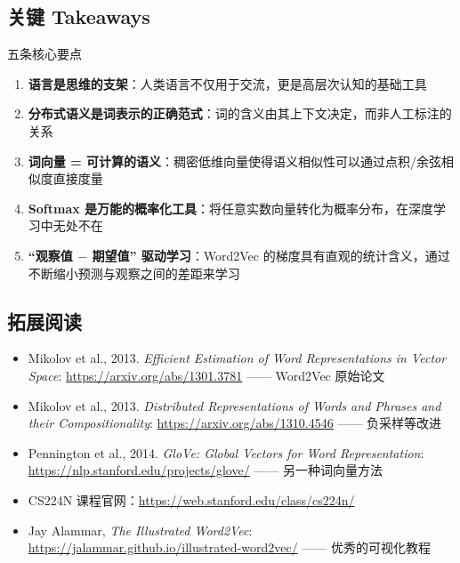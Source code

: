 \subsection{关键 Takeaways}

\begin{importantbox}{五条核心要点}
\begin{enumerate}
    \item \textbf{语言是思维的支架}：人类语言不仅用于交流，更是高层次认知的基础工具
    \item \textbf{分布式语义是词表示的正确范式}：词的含义由其上下文决定，而非人工标注的关系
    \item \textbf{词向量 = 可计算的语义}：稠密低维向量使得语义相似性可以通过点积/余弦相似度直接度量
    \item \textbf{Softmax 是万能的概率化工具}：将任意实数向量转化为概率分布，在深度学习中无处不在
    \item \textbf{``观察值 $-$ 期望值'' 驱动学习}：Word2Vec 的梯度具有直观的统计含义，通过不断缩小预测与观察之间的差距来学习
\end{enumerate}
\end{importantbox}

\subsection{拓展阅读}

\begin{itemize}
    \item Mikolov et al., 2013. \textit{Efficient Estimation of Word Representations in Vector Space}: \url{https://arxiv.org/abs/1301.3781} —— Word2Vec 原始论文
    \item Mikolov et al., 2013. \textit{Distributed Representations of Words and Phrases and their Compositionality}: \url{https://arxiv.org/abs/1310.4546} —— 负采样等改进
    \item Pennington et al., 2014. \textit{GloVe: Global Vectors for Word Representation}: \url{https://nlp.stanford.edu/projects/glove/} —— 另一种词向量方法
    \item CS224N 课程官网：\url{https://web.stanford.edu/class/cs224n/}
    \item Jay Alammar, \textit{The Illustrated Word2Vec}: \url{https://jalammar.github.io/illustrated-word2vec/} —— 优秀的可视化教程
\end{itemize}


